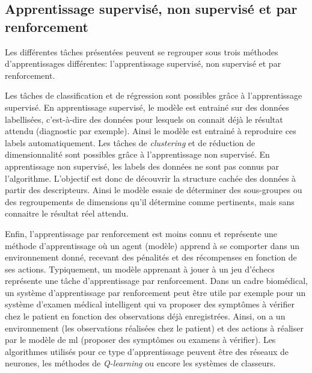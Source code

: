 \subsection{Apprentissage supervisé, non supervisé et par renforcement}
Les différentes tâches présentées peuvent se regrouper sous trois méthodes d'apprentissages différentes: l'apprentissage supervisé, non supervisé et par renforcement.

Les tâches de classification et de régression sont possibles grâce à l'apprentissage supervisé. En apprentissage supervisé, le modèle est entrainé sur des données labellisées, c'est-à-dire des données pour lesquels on connait déjà le résultat attendu (diagnostic par exemple). Ainsi le modèle est entrainé à reproduire ces labels automatiquement.
Les tâches de \textit{clustering} et de réduction de dimensionnalité sont possibles grâce à l'apprentissage non supervisé. En apprentissage non supervisé, les labels des données ne sont pas connus par l'algorithme. L'objectif est donc de découvrir la structure cachée des données à partir des descripteurs. Ainsi le modèle essaie de déterminer des sous-groupes ou des regroupements de dimensions qu'il détermine comme pertinents, mais sans connaitre le résultat réel attendu.

Enfin, l'apprentissage par renforcement est moins connu et représente une méthode d'apprentissage où un agent (modèle) apprend à se comporter dans un environnement donné, recevant des pénalités et des récompenses en fonction de ses actions. Typiquement, un modèle apprenant à jouer à un jeu d'échecs représente une tâche d'apprentissage par renforcement. Dans un cadre biomédical, un système d'apprentissage par renforcement peut être utile par exemple pour un système d'examen médical intelligent qui va proposer des symptômes à vérifier chez le patient en fonction des observations déjà enregistrées. Ainsi, on a un environnement (les observations réalisées chez le patient) et des actions à réaliser par le modèle de \gls{ml} (proposer des symptômes ou examens à vérifier). Les algorithmes utilisés pour ce type d'apprentissage peuvent être des réseaux de neurones, les méthodes de \textit{Q-learning} ou encore les systèmes de classeurs.

